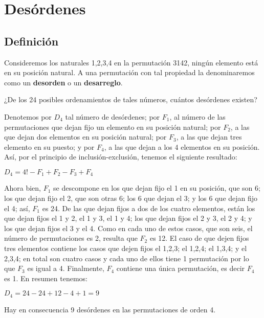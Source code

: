 \section{Desórdenes}

\subsection{Definición}

Consideremos los naturales 1,2,3,4 en la permutación 3142, ningún elemento está en su posición natural. A una permutación con tal propiedad la denominaremos como un \textbf{desorden} o un \textbf{desarreglo}. 

\begin{problema}
    ¿De los 24 posibles ordenamientos de tales números, cuántos desórdenes existen?
\end{problema}

\begin{solucion}
    Denotemos por $D_4$ tal número de desórdenes; por $F_1$, al número de las permutaciones que dejan fijo un elemento en su posición natural; por $F_2$, a las que dejan dos elementos en su posición natural; por $F_3$, a las que dejan tres elemento en su puesto; y por $F_4$, a las que dejan a los 4 elementos en su posición. Así, por el principio de inclusión-exclusión, tenemos el siguiente resultado:

    \begin{center}
        $D_4= 4!-F_1+F_2-F_3+F_4$
    \end{center}

    Ahora bien, $F_1$ se descompone en los que dejan fijo el 1 en su posición, que son 6; los que dejan fijo el 2, que son otras 6; los 6 que dejan el 3; y los 6 que dejan fijo el 4; así, $F_1$ es 24. De las que dejan fijos a dos de los cuatro elementos, están los que dejan fijos el 1 y 2, el 1 y 3, el 1 y 4; los que dejan fijos el 2 y 3, el 2 y 4; y los que dejan fijos el 3 y el 4. Como en cada uno de estos casos, que son seis, el número de permutaciones es 2, resulta que $F_2$ es 12. El caso de que dejen fijos tres elementos contiene los casos  que dejen fijos el 1,2,3; el 1,2,4; el 1,3,4; y el 2,3,4; en total son cuatro casos y cada uno de ellos tiene 1 permutación por lo que $F_3$ es igual a 4. Finalmente, $F_4$ contiene una única permutación, es decir $F_4$ es 1. En resumen tenemos:

    \begin{center}
        $D_4= 24 - 24 + 12 - 4 + 1 = 9$
    \end{center}

    Hay en consecuencia 9 desórdenes en las permutaciones de orden 4.
\end{solucion}

